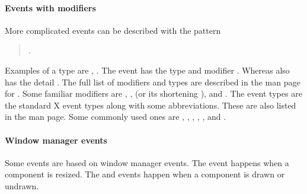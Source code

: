 \paragraph{Events with modifiers}
More complicated events can be described with the pattern 

\begin{quotation}
.   
\end{quotation}

Examples of a type are ,
. The event  has the
type  and modifier . Whereas
 also has the detail . The full
list of modifiers and types are described in the man page for
. Some familiar modifiers are , ,
 (or its shortening ),  and
. The event types are the standard X event types along
with some abbreviations. These are also listed in the  man
page. Some commonly used ones are ,
, , ,
, and . 

\paragraph{Window manager events}
Some events are based on window manager events. The 
event happens when a component is resized. The  and
 events happen when a component is drawn or undrawn.

